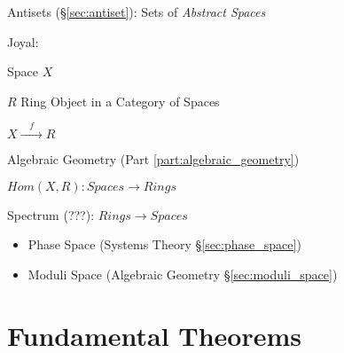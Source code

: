 Antisets (\S\ref{sec:antiset}): Sets of \emph{Abstract Spaces}

Joyal: %

Space $X$

$R$ Ring Object in a Category of Spaces

$X \xrightarrow{\quad f \quad} R$

Algebraic Geometry (Part \ref{part:algebraic_geometry})

$Hom(X,R) : Spaces \rightarrow Rings$

Spectrum (???): $Rings \rightarrow Spaces$

\begin{itemize}
  \item Phase Space (Systems Theory \S\ref{sec:phase_space})
  \item Moduli Space (Algebraic Geometry \S\ref{sec:moduli_space})
\end{itemize}



\section{Fundamental Theorems}\label{sec:fundamental_theorems}

